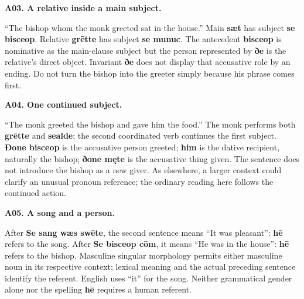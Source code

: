 \par\begin{minipage}{\linewidth}\raggedright
\textbf{A03. A relative inside a main subject.}

“The bishop whom the monk greeted sat in the house.” Main \textbf{sæt} has subject \textbf{se bisceop}. Relative \textbf{grētte} has subject \textbf{se munuc}. The antecedent \textbf{bisceop} is nominative as the main-clause subject but the person represented by \textbf{ðe} is the relative’s direct object. Invariant \textbf{ðe} does not display that accusative role by an ending. Do not turn the bishop into the greeter simply because his phrase comes first.

\end{minipage}\par\addvspace{4pt}

\par\begin{minipage}{\linewidth}\raggedright
\textbf{A04. One continued subject.}

“The monk greeted the bishop and gave him the food.” The monk performs both \textbf{grētte} and \textbf{sealde}; the second coordinated verb continues the first subject. \textbf{Ðone bisceop} is the accusative person greeted; \textbf{him} is the dative recipient, naturally the bishop; \textbf{ðone męte} is the accusative thing given. The sentence does not introduce the bishop as a new giver. As elsewhere, a larger context could clarify an unusual pronoun reference; the ordinary reading here follows the continued action.

\end{minipage}\par\addvspace{4pt}

\par\begin{minipage}{\linewidth}\raggedright
\textbf{A05. A song and a person.}

After \textbf{Se sang wæs swēte}, the second sentence means “It was pleasant”: \textbf{hē} refers to the song. After \textbf{Se bisceop cōm}, it means “He was in the house”: \textbf{hē} refers to the bishop. Masculine singular morphology permits either masculine noun in its respective context; lexical meaning and the actual preceding sentence identify the referent. English uses “it” for the song. Neither grammatical gender alone nor the spelling \textbf{hē} requires a human referent.

\end{minipage}\par\addvspace{4pt}

